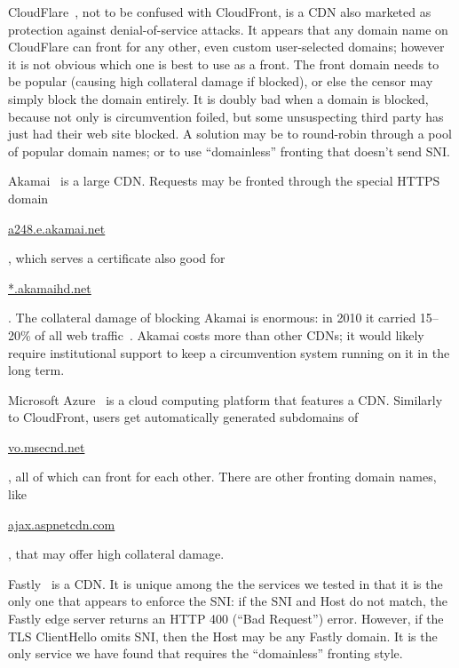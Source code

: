 \documentclass[conference]{IEEEtran}
\newcommand{\meek}{\texttt{meek}\xspace}
\def\urll#1{\begin{NoHyper}\url{#1}\end{NoHyper}}
\begin{document}
CloudFlare~\cite{cloudflare},
not to be confused with CloudFront,
is a CDN also marketed as protection against
denial-of-service attacks.
It appears that any domain name on CloudFlare
can front for any other, even custom user-selected domains;
however it is not obvious which one is best to use as a front.
The front domain needs to be popular
(causing high collateral damage if blocked),
or else the censor may simply block the domain entirely.
It is doubly bad when a domain is blocked, because not only is circumvention foiled,
but some unsuspecting third party has just had their web site blocked.
A solution may be to round-robin through
a pool of popular domain names;
or to use ``domainless'' fronting that doesn't send SNI.

Akamai~\cite{akamai-site} is a large CDN.
Requests may be fronted through the special HTTPS domain
\urll{a248.e.akamai.net},
which serves a certificate also good for \urll{*.akamaihd.net}.
The collateral damage of blocking Akamai is enormous:
in 2010 it carried 15--20\% of all web traffic~\cite{akamai}.
Akamai costs more than other CDNs;
it would likely require institutional support
to keep a circumvention system running on it in the long term.

Microsoft Azure~\cite{azure}
is a cloud computing platform that features a CDN.
Similarly to CloudFront, users get automatically generated subdomains
of \urll{vo.msecnd.net},
all of which can front for each other.
There are other fronting domain names, like \urll{ajax.aspnetcdn.com},
that may offer high collateral damage.

Fastly~\cite{fastly} is a CDN.
It is unique among the the services we tested in that
it is the only one that appears to enforce the SNI:
if the SNI and Host do not match,
the Fastly edge server returns an HTTP 400 (``Bad Request'') error.
However, if the TLS ClientHello omits SNI, then the Host may be any Fastly domain.
It is the only service we have found
that requires the ``domainless'' fronting style.
\end{document}
